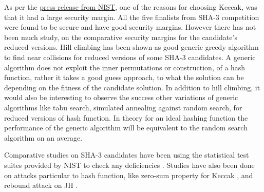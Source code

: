 As per the \href{"http://csrc.nist.gov/groups/ST/hash/sha-3/sha-3\_selection\_announcement.pdf"}{press release from NIST}, 
one of the reasons for choosing Keccak, was that it had a large security margin. All the five finalists from SHA-3 competition
were found to be secure and have good security margins. However there has not been much study, on the comparative security
margins for the candidate's reduced versions. Hill climbing has been shown as good generic greedy algorithm to find 
near collisions for reduced versions of some SHA-3 candidates. A generic algorithm does not exploit the inner permutations
or construction, of a hash function, rather it takes a good guess approach, to what the solution can be depending on the fitness
of the candidate solution. In addition to hill climbing, it would also be interesting to observe the success other 
variations of generic algorithms like tabu search, simulated annealing against random search, for reduced versions of 
hash function. In theory for an ideal hashing function the performance of the generic algorithm will be equivalent to 
the random search algorithm on an average.

Comparative studies on SHA-3 candidates have been using the statistical test suites provided by NIST to check any 
deficiencies \cite{00030, 00032}. Studies have also been done on attacks particular to hash function, like zero-sum
property for Keccak \cite{00031}, and rebound attack on JH \cite{00043}.
